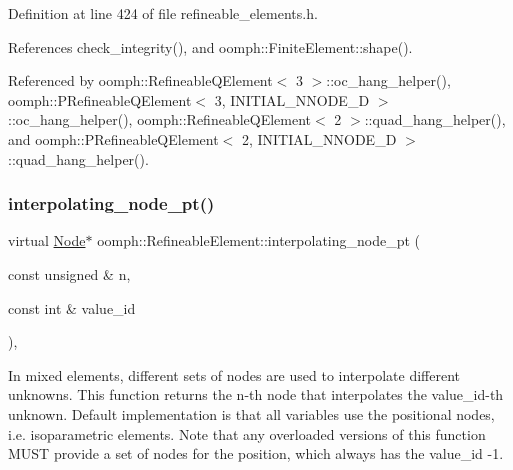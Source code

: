 Definition at line 424 of file refineable\+\_\+elements.\+h.



References check\+\_\+integrity(), and oomph\+::\+Finite\+Element\+::shape().



Referenced by oomph\+::\+Refineable\+Q\+Element$<$ 3 $>$\+::oc\+\_\+hang\+\_\+helper(), oomph\+::\+P\+Refineable\+Q\+Element$<$ 3, I\+N\+I\+T\+I\+A\+L\+\_\+\+N\+N\+O\+D\+E\+\_\+D $>$\+::oc\+\_\+hang\+\_\+helper(), oomph\+::\+Refineable\+Q\+Element$<$ 2 $>$\+::quad\+\_\+hang\+\_\+helper(), and oomph\+::\+P\+Refineable\+Q\+Element$<$ 2, I\+N\+I\+T\+I\+A\+L\+\_\+\+N\+N\+O\+D\+E\+\_\+D $>$\+::quad\+\_\+hang\+\_\+helper().

\mbox{\label{classoomph_1_1RefineableElement_ab27986fc2f6033a4758662cde78a7b76}} 
\subsubsection{\texorpdfstring{interpolating\+\_\+node\+\_\+pt()}{interpolating\_node\_pt()}}
{\footnotesize\ttfamily virtual \hyperlink{classoomph_1_1Node}{Node}$\ast$ oomph\+::\+Refineable\+Element\+::interpolating\+\_\+node\+\_\+pt (\begin{DoxyParamCaption}\item[{const unsigned \&}]{n,  }\item[{const int \&}]{value\+\_\+id }\end{DoxyParamCaption})\hspace{0.3cm}{\ttfamily [inline]}, {\ttfamily [virtual]}}



In mixed elements, different sets of nodes are used to interpolate different unknowns. This function returns the n-\/th node that interpolates the value\+\_\+id-\/th unknown. Default implementation is that all variables use the positional nodes, i.\+e. isoparametric elements. Note that any overloaded versions of this function M\+U\+ST provide a set of nodes for the position, which always has the value\+\_\+id -\/1. 



